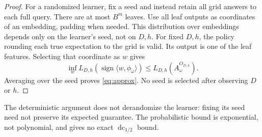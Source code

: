 \documentclass[11pt]{article}
\DeclareMathOperator{\dc}{dc}
\DeclareMathOperator{\sign}{sign}
\newcommand{\1}{\mathbf 1}
\begin{document}
\begin{proof}
For a randomized learner, fix a seed and instead retain all grid answers to each full query. There are at most $B^m$ leaves. Use all leaf outputs as coordinates of an embedding, padding when needed. This distribution over embeddings depends only on the learner's seed, not on $D,h$. For fixed $D,h$, the policy rounding each true expectation to the grid is valid. Its output is one of the leaf features. Selecting that coordinate as $w$ gives
\[
 \inf_w L_{D,h}(\sign\langle w,\phi_\omega\rangle)
 \leq L_{D,h}(A_\omega^{O_{D,h}}).
\]
Averaging over the seed proves \eqref{eq:approx}. No seed is selected after observing $D$ or $h$.
\end{proof}

The deterministic argument does not derandomize the learner: fixing its seed need not preserve its expected guarantee. The probabilistic bound is exponential, not polynomial, and gives no exact $\dc_{1/2}$ bound.


\end{document}
